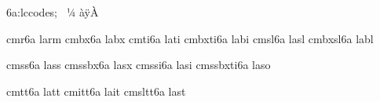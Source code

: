
\modifydef 6a:lccodes; {%
   \skipfirststep
   \lccodesloop ^^a0^^bc^^80%
   \lccodesloop ^^e0^^ff^^c0%
   \def\lccodesback {\zerolccodes ^^80^^ff}%
}



\registerECfont    cmr6a       larm %
\registerECfont    cmbx6a      labx %
\registerECfont    cmti6a      lati %
\registerECfont    cmbxti6a    labi %
\registerECfont    cmsl6a      lasl %
\registerECfont    cmbxsl6a    labl %

\registerECfont    cmss6a      lass %
\registerECfont    cmssbx6a    lasx %
\registerECfont    cmssi6a     lasi %
\registerECfont    cmssbxti6a  laso %

\registerECTTfont  cmtt6a      latt %
\registerECTTfont  cmitt6a     lait %
\registerECTTfont  cmsltt6a    last %














